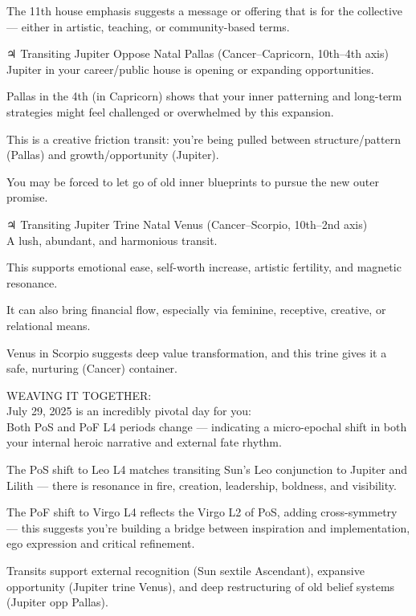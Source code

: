 \documentclass{article}
\begin{document}
The 11th house emphasis suggests a message or offering that is for the
collective --- either in artistic, teaching, or community-based terms.

♃ Transiting Jupiter Oppose Natal Pallas (Cancer--Capricorn, 10th--4th
axis)\\
Jupiter in your career/public house is opening or expanding
opportunities.

Pallas in the 4th (in Capricorn) shows that your inner patterning and
long-term strategies might feel challenged or overwhelmed by this
expansion.

This is a creative friction transit: you're being pulled between
structure/pattern (Pallas) and growth/opportunity (Jupiter).

You may be forced to let go of old inner blueprints to pursue the new
outer promise.

♃ Transiting Jupiter Trine Natal Venus (Cancer--Scorpio, 10th--2nd
axis)\\
A lush, abundant, and harmonious transit.

This supports emotional ease, self-worth increase, artistic fertility,
and magnetic resonance.

It can also bring financial flow, especially via feminine, receptive,
creative, or relational means.

Venus in Scorpio suggests deep value transformation, and this trine
gives it a safe, nurturing (Cancer) container.

 WEAVING IT TOGETHER:\\
July 29, 2025 is an incredibly pivotal day for you:\\
Both PoS and PoF L4 periods change --- indicating a micro-epochal shift
in both your internal heroic narrative and external fate rhythm.

The PoS shift to Leo L4 matches transiting Sun's Leo conjunction to
Jupiter and Lilith --- there is resonance in fire, creation, leadership,
boldness, and visibility.

The PoF shift to Virgo L4 reflects the Virgo L2 of PoS, adding
cross-symmetry --- this suggests you're building a bridge between
inspiration and implementation, ego expression and critical refinement.

Transits support external recognition (Sun sextile Ascendant), expansive
opportunity (Jupiter trine Venus), and deep restructuring of old belief
systems (Jupiter opp Pallas).
\end{document}
